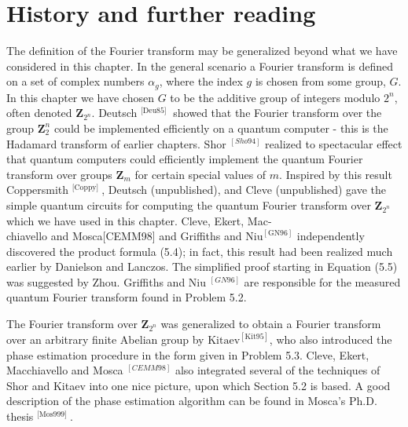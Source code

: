 \section*{History and further reading}
The definition of the Fourier transform may be generalized beyond what we have considered in this chapter. In the general scenario a Fourier transform is defined on a set of complex numbers $\alpha_{g}$, where the index $g$ is chosen from some group, $G$. In this chapter we have chosen $G$ to be the additive group of integers modulo $2^{n}$, often denoted $\mathbf{Z}_{2^{n}}$. Deutsch ${ }^{[\text {Deu85] }}$ showed that the Fourier transform over the group $\mathbf{Z}_{2}^{n}$ could be implemented efficiently on a quantum computer - this is the Hadamard transform of earlier chapters. Shor ${ }^{[S h o 94]}$ realized to spectacular effect that quantum computers could efficiently implement the quantum Fourier transform over groups $\mathbf{Z}_{m}$ for certain special values of $m$. Inspired by this result Coppersmith ${ }^{[\text {Coppy] }}$, Deutsch (unpublished), and Cleve (unpublished) gave the simple quantum circuits for computing the quantum Fourier transform over $\mathbf{Z}_{2^{n}}$ which we have used in this chapter. Cleve, Ekert, Mac-\\
chiavello and Mosca[CEMM98] and Griffiths and $\mathrm{Niu}^{[\mathrm{GN} 96]}$ independently discovered the product formula (5.4); in fact, this result had been realized much earlier by Danielson and Lanczos. The simplified proof starting in Equation (5.5) was suggested by Zhou. Griffiths and Niu ${ }^{[G N 96]}$ are responsible for the measured quantum Fourier transform found in Problem 5.2.

The Fourier transform over $\mathbf{Z}_{2^{n}}$ was generalized to obtain a Fourier transform over an arbitrary finite Abelian group by $\mathrm{Kitaev}^{[\mathrm{Kit} 95]}$, who also introduced the phase estimation procedure in the form given in Problem 5.3. Cleve, Ekert, Macchiavello and Mosca ${ }^{[C E M M 98]}$ also integrated several of the techniques of Shor and Kitaev into one nice picture, upon which Section 5.2 is based. A good description of the phase estimation algorithm can be found in Mosca's Ph.D. thesis ${ }^{[\text {Mos999] }}$.

